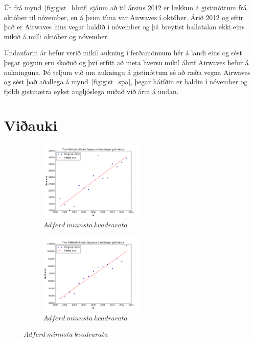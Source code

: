 \documentclass[11pt,a4paper]{amsart}
\theoremstyle{plain}
\theoremstyle{definition}
\theoremstyle{remark}
\begin{document}
Út frá mynd~\ref{fig:gist_hlutf} sjáum að til ársins 2012 er lækkun á gistinóttum frá október til nóvember, en á þeim tíma var Airwaves í október. Árið 2012 og eftir það er Airwaves hins vegar haldið í nóvember og þá breytist hallatalan ekki eins mikið á milli október og nóvember.\par

Undanfarin ár hefur verið mikil aukning í ferðamönnum hér á landi eins og sést þegar gögnin eru skoðuð og því erfitt að meta hversu mikil áhrif Airwaves hefur á aukninguna. Þó teljum við um aukningu á gistinóttum sé að ræða vegna Airwaves og sést það aðallega á mynd~\ref{fig:gist_spa}, þegar hátíðin er haldin í nóvember og fjöldi gistinætra eykst augljóslega miðað við árin á undan.

\section{Viðauki}

\begin{figure}[H]
	\centering
	\begin{subfigure}[b]{0.4\textwidth}
		\includegraphics[height=40mm]{mynd2.png}
		\caption{$ Adferd\ minnsta\ kvadrarata $\label{fig:mynd2}}
	\end{subfigure}
	\begin{subfigure}[b]{0.4\textwidth}
		\includegraphics[height=40mm]{mynd3.png}
		\caption{$ Adferd\ minnsta\ kvadrarata $\label{fig:mynd3}}	
	\end{subfigure}
\end{figure}
\end{document}
